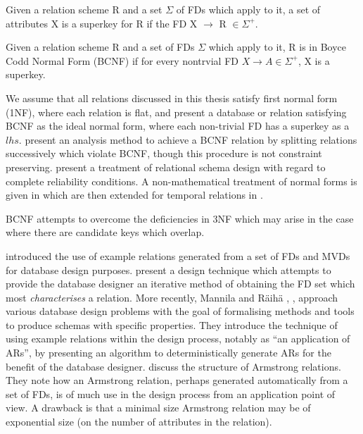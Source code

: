 \begin{definition}[SuperKey]
\begin{rm}
Given a relation scheme R and a set  $\Sigma$ of FDs which apply to it, a  set of attributes X is a superkey for R if the FD X $\to$ R $\in \Sigma^+$.
\end{rm}
\end{definition}

\begin{definition}
\begin{rm}
Given a relation scheme R and a set of FDs $\Sigma$ which apply to it, R is in Boyce Codd Normal Form (BCNF) if for every nontrvial FD $X \to A \in \Sigma^+$, X is a superkey.
\end{rm}
\end{definition}


We assume that all relations discussed in this thesis
satisfy first normal form (1NF), where each relation is flat, and
present a database or relation satisfying BCNF as the ideal normal form,
where each non-trivial FD has a superkey as a $lhs$. \cite{bb79}
present an analysis method to achieve a BCNF relation by splitting
relations successively which violate BCNF, though this procedure is
not constraint preserving.  \cite{zm81} present a treatment of relational schema design with regard to complete reliability conditions.  A non-mathematical treatment of normal forms is given in \cite{ken83} which are then
extended for temporal relations in \cite{jss92}. 

BCNF attempts to overcome the deficiencies in 3NF which may arise in the case  where there are candidate keys which overlap.


\cite{sm81} introduced the
use of example relations generated from a set of FDs and MVDs  for 
database design purposes. 
\cite{sm81} present a design technique which attempts to provide the
database designer an iterative method of obtaining the FD set which
most {\em characterises} a relation.  More recently, 
Mannila and R\"{a}ih\"{a} , \cite{mr86, mr92}, approach various database
design problems with the goal of formalising methods and tools to
produce schemas with specific properties. They 
introduce the technique of using example relations within the design
process, notably as ``an application of ARs'', by presenting an
algorithm to deterministically generate ARs for the benefit of the
database designer. \cite{bdfs84} discuss the structure of Armstrong relations.  They note how an
Armstrong relation, perhaps generated automatically from a set of FDs, is of
much use in the design process from an application point of view.  A drawback
is that a minimal size Armstrong relation may be of exponential size (on the 
number of attributes in the relation).

